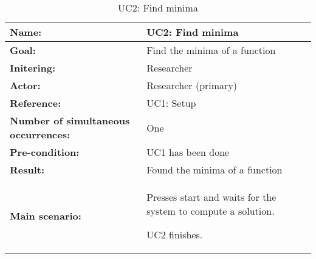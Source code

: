 \begin{table}[H]
	\begin{tabularx}{\textwidth}{| >{\raggedright\arraybackslash}p{3.3 cm} | >{\raggedright\arraybackslash}X |} \hline
		
		\textbf{Name:} 						& UC2: Find minima\\ \hline
		\textbf{Goal:}						& Find the minima of a function \\ \hline
		\textbf{Initering:}					& Researcher \\ \hline
		\textbf{Actor:} 					& Researcher (primary) \\ \hline
		\textbf{Reference:} 				& UC1: Setup \\ \hline
		\textbf{Number of simultaneous occurrences:} & One \\ \hline
		\textbf{Pre-condition:} 				& UC1 has been done \\ \hline
		\textbf{Result:}					& Found the minima of a function \\ \hline
		\textbf{Main scenario:}				& 
		
		\begin{packed_enum}
			\item Presses start and waits for the system to compute a solution.
			\item UC2 finishes.
		\end{packed_enum} \\ \hline
	\end{tabularx}
\caption{UC2: Find minima}
\label{tbl:uc2}
\end{table}
